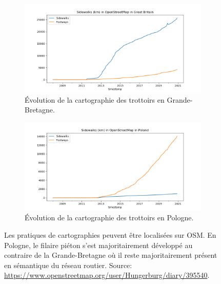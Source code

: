 \begin{figure}[ht]
    \centering
    \begin{subfigure}[t]{.49\linewidth}
        \centering
        \includegraphics[width=\textwidth]{images/modelisation/Sidewalks-Length-Britain.png}
        \caption{Évolution de la cartographie des trottoirs en Grande-Bretagne.\label{fig:modelisation_osm_gb}}
    \end{subfigure}
    \hfill
    \begin{subfigure}[t]{.49\linewidth}
        \centering
        \includegraphics[width=\textwidth]{images/modelisation/Sidewalks-Length-Poland.png}
        \caption{Évolution de la cartographie des trottoirs en Pologne. \label{fig:modelisation_osm_pologne}}
    \end{subfigure}
    \caption[Variation des pratiques de contribution sur OpenStreetMap]{Les pratiques de cartographies peuvent être localisées sur OSM. En Pologne, le filaire piéton s'est majoritairement développé au contraire de la Grande-Bretagne où il reste majoritairement présent en sémantique du réseau routier. Source: \url{https://www.openstreetmap.org/user/Hungerburg/diary/395540}.}
    \label{fig:modelisation_osm_gb_pologne}
\end{figure}


